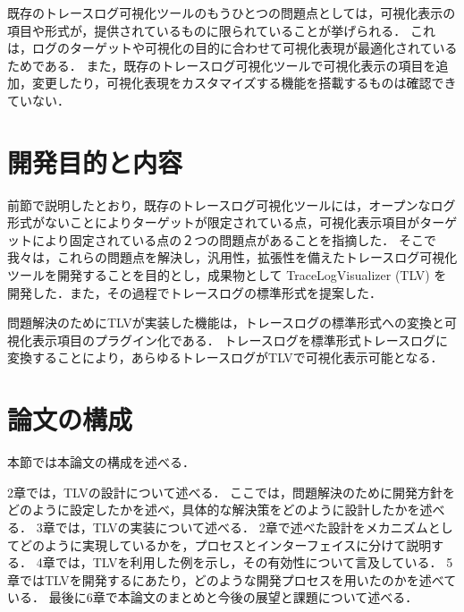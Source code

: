 既存のトレースログ可視化ツールのもうひとつの問題点としては，可視化表示の項目や形式が，提供されているものに限られていることが挙げられる．
これは，ログのターゲットや可視化の目的に合わせて可視化表現が最適化されているためである．
また，既存のトレースログ可視化ツールで可視化表示の項目を追加，変更したり，可視化表現をカスタマイズする機能を搭載するものは確認できていない．

\section{開発目的と内容}

前節で説明したとおり，既存のトレースログ可視化ツールには，オープンなログ形式がないことによりターゲットが限定されている点，可視化表示項目がターゲットにより固定されている点の２つの問題点があることを指摘した．
そこで我々は，これらの問題点を解決し，汎用性，拡張性を備えたトレースログ可視化ツールを開発することを目的とし，成果物として TraceLogVisualizer (TLV) を開発した．また，その過程でトレースログの標準形式を提案した．

問題解決のためにTLVが実装した機能は，トレースログの標準形式への変換と可視化表示項目のプラグイン化である．
トレースログを標準形式トレースログに変換することにより，あらゆるトレースログがTLVで可視化表示可能となる．

\section{論文の構成}
本節では本論文の構成を述べる．

2章では，TLVの設計について述べる．
ここでは，問題解決のために開発方針をどのように設定したかを述べ，具体的な解決策をどのように設計したかを述べる．
3章では，TLVの実装について述べる．
2章で述べた設計をメカニズムとしてどのように実現しているかを，プロセスとインターフェイスに分けて説明する．
4章では，TLVを利用した例を示し，その有効性について言及している．
5章ではTLVを開発するにあたり，どのような開発プロセスを用いたのかを述べている．
最後に6章で本論文のまとめと今後の展望と課題について述べる．